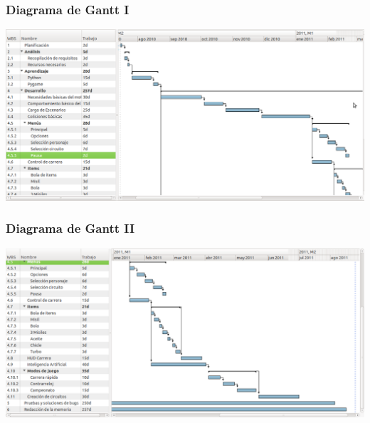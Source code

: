 \begin{frame}
    \frametitle{Diagrama de Gantt I}

        \begin{center}
                \includegraphics[scale=0.25]{imagenes/gant1.png}
        \end{center}
\end{frame}

\begin{frame}
    \frametitle{Diagrama de Gantt II}
        \begin{center}
                \includegraphics[scale=0.25]{imagenes/gant2.png}
        \end{center}
\end{frame}

